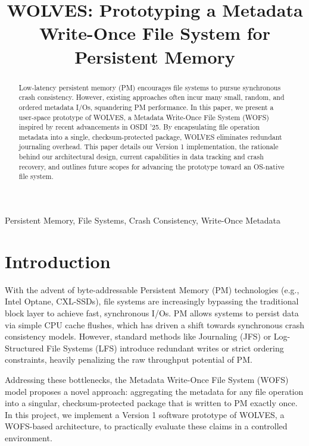 \documentclass[conference]{IEEEtran}
\begin{document}
\title{WOLVES: Prototyping a Metadata Write-Once File System for Persistent Memory}

\author{
}

\maketitle

\begin{abstract}
Low-latency persistent memory (PM) encourages file systems to pursue synchronous crash consistency. However, existing approaches often incur many small, random, and ordered metadata I/Os, squandering PM performance. In this paper, we present a user-space prototype of WOLVES, a Metadata Write-Once File System (WOFS) inspired by recent advancements in OSDI '25. By encapsulating file operation metadata into a single, checksum-protected package, WOLVES eliminates redundant journaling overhead. This paper details our Version 1 implementation, the rationale behind our architectural design, current capabilities in data tracking and crash recovery, and outlines future scopes for advancing the prototype toward an OS-native file system.
\end{abstract}

\begin{IEEEkeywords}
Persistent Memory, File Systems, Crash Consistency, Write-Once Metadata
\end{IEEEkeywords}

\section{Introduction}
With the advent of byte-addressable Persistent Memory (PM) technologies (e.g., Intel Optane, CXL-SSDs), file systems are increasingly bypassing the traditional block layer to achieve fast, synchronous I/Os. PM allows systems to persist data via simple CPU cache flushes, which has driven a shift towards synchronous crash consistency models. However, standard methods like Journaling (JFS) or Log-Structured File Systems (LFS) introduce redundant writes or strict ordering constraints, heavily penalizing the raw throughput potential of PM.

Addressing these bottlenecks, the Metadata Write-Once File System (WOFS) model proposes a novel approach: aggregating the metadata for any file operation into a singular, checksum-protected package that is written to PM exactly once. In this project, we implement a Version 1 software prototype of WOLVES, a WOFS-based architecture, to practically evaluate these claims in a controlled environment.
\end{document}
